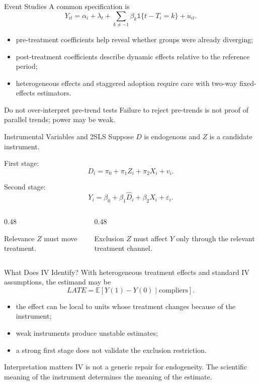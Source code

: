 \documentclass[aspectratio=169,11pt]{beamer}
\newcommand{\E}{\mathbb{E}}
\begin{document}
\begin{frame}{Event Studies}
A common specification is
\[
Y_{it}
=
\alpha_i+\lambda_t+
\sum_{k\neq -1}\beta_k\mathbb{1}\{t-T_i=k\}+u_{it}.
\]

\begin{itemize}
\item pre-treatment coefficients help reveal whether groups were already diverging;
\item post-treatment coefficients describe dynamic effects relative to the reference period;
\item heterogeneous effects and staggered adoption require care with two-way fixed-effects estimators.
\end{itemize}

\begin{block}{Do not over-interpret pre-trend tests}
Failure to reject pre-trends is not proof of parallel trends; power may be weak.
\end{block}
\end{frame}

\begin{frame}{Instrumental Variables and 2SLS}
Suppose \(D\) is endogenous and \(Z\) is a candidate instrument.

First stage:
\[
D_i=\pi_0+\pi_1Z_i+\pi_2X_i+v_i.
\]

Second stage:
\[
Y_i=\beta_0+\beta_1\widehat{D}_i+\beta_2X_i+\varepsilon_i.
\]

\begin{columns}
\begin{column}{0.48\textwidth}
\begin{block}{Relevance}
\(Z\) must move treatment.
\end{block}
\end{column}
\begin{column}{0.48\textwidth}
\begin{alertblock}{Exclusion}
\(Z\) must affect \(Y\) only through the relevant treatment channel.
\end{alertblock}
\end{column}
\end{columns}
\end{frame}

\begin{frame}{What Does IV Identify?}
With heterogeneous treatment effects and standard IV assumptions, the estimand may be
\[
LATE=\E[Y(1)-Y(0)\mid\text{compliers}].
\]

\begin{itemize}
\item the effect can be local to units whose treatment changes because of the instrument;
\item weak instruments produce unstable estimates;
\item a strong first stage does not validate the exclusion restriction.
\end{itemize}

\begin{alertblock}{Interpretation matters}
IV is not a generic repair for endogeneity. The scientific meaning of the instrument determines the meaning of the estimate.
\end{alertblock}
\end{frame}
\end{document}
